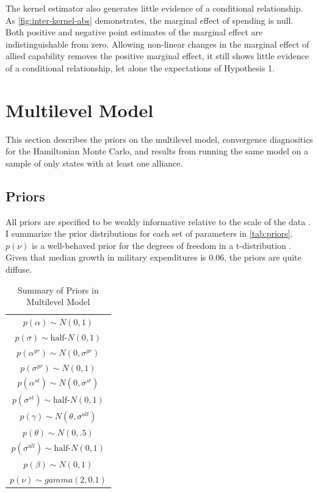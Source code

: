 \documentclass[12pt]{article}
\begin{document}
The kernel estimator also generates little evidence of a conditional relationship. 
As \autoref{fig:inter-kernel-abs} demonstrates, the marginal effect of spending is null. 
Both positive and negative point estimates of the marginal effect are indistinguishable from zero. 
Allowing non-linear changes in the marginal effect of allied capability removes the positive marginal effect, it still shows little evidence of a conditional relationship, let alone the expectations of Hypothesis 1. 





\section{Multilevel Model}

This section describes the priors on the multilevel model, convergence diagnositics for the Hamiltonian Monte Carlo, and results from running the same model on a sample of only states with at least one alliance. 

\subsection{Priors} 

All priors are specified to be weakly informative relative to the scale of the data \citep{Gelmanetal2017}. 
I summarize the prior distributions for each set of parameters in \autoref{tab:priors}. 
$p(\nu)$ is a well-behaved prior for the degrees of freedom in a t-distribution \citep{JuarezSteele2010}. 
Given that median growth in military expenditures is 0.06, the priors are quite diffuse. 


\begin{table} %
\begin{center}
\begin{tabular}{c} 
$ p(\alpha) \sim N(0, 1)$  \\
$ p(\sigma) \sim \mbox{half-}N(0, 1) $ \\
$ p(\alpha^{yr}) \sim N(0, \sigma^{yr}) $ \\ 
$ p(\sigma^{yr}) \sim N(0, 1) $ \\
$ p(\alpha^{st}) \sim N(0, \sigma^{st}) $ \\ 
$ p(\sigma^{st}) \sim \mbox{half-}N(0, 1) $ \\ 
$ p(\gamma) \sim N(\theta, \sigma^{all}) $ \\ 
$ p(\theta) \sim N(0, .5) $ \\
$ p(\sigma^{all}) \sim \mbox{half-}N(0, 1) $ \\
$ p(\beta) \sim N(0, 1) $ \\
$ p(\nu) \sim gamma(2, 0.1)$ 
\end{tabular} 
\caption{Summary of Priors in Multilevel Model} 
\label{tab:priors}
\end{center} 
\end{table} 
\end{document}
